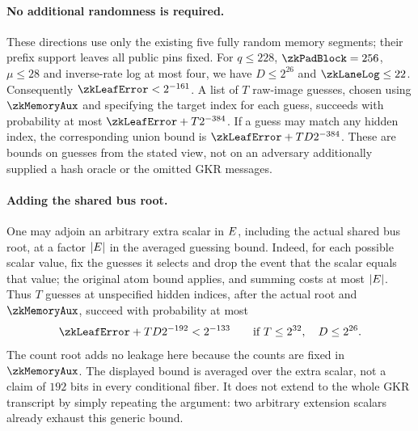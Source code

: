 \paragraph{No additional randomness is required.} These directions use only the existing five fully random memory segments; their prefix support leaves all public pins fixed. For $q\le228$, $\zkPadBlock=256$, $\mu\le28$ and inverse-rate log at most four, we have $D\le2^{26}$ and $\zkLaneLog\le22$. Consequently $\zkLeafError<2^{-161}$. A list of $T$ raw-image guesses, chosen using $\zkMemoryAux$ and specifying the target index for each guess, succeeds with probability at most $\zkLeafError+T2^{-384}$. If a guess may match any hidden index, the corresponding union bound is $\zkLeafError+TD2^{-384}$. These are bounds on guesses from the stated view, not on an adversary additionally supplied a hash oracle or the omitted GKR messages.

\paragraph{Adding the shared bus root.} One may adjoin an arbitrary extra scalar in $E$, including the actual shared bus root, at a factor $|E|$ in the averaged guessing bound. Indeed, for each possible scalar value, fix the guesses it selects and drop the event that the scalar equals that value; the original atom bound applies, and summing costs at most $|E|$. Thus $T$ guesses at unspecified hidden indices, after the actual root and $\zkMemoryAux$, succeed with probability at most
\[
 \zkLeafError+TD2^{-192}<2^{-133}
 \qquad\text{if }T\le2^{32},\quad D\le2^{26}.
\]
The count root adds no leakage here because the counts are fixed in $\zkMemoryAux$. The displayed bound is averaged over the extra scalar, not a claim of $192$ bits in every conditional fiber. It does not extend to the whole GKR transcript by simply repeating the argument: two arbitrary extension scalars already exhaust this generic bound.

